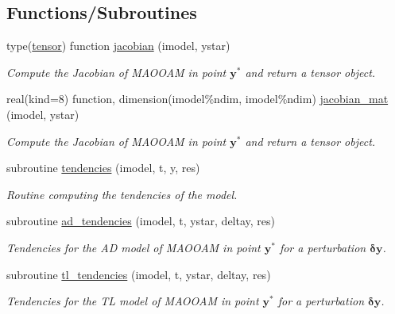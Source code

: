 \subsection*{Functions/\+Subroutines}
\begin{DoxyCompactItemize}
\item 
type(\hyperlink{structtensor__def_1_1tensor}{tensor}) function \hyperlink{namespacemodel__def_a85b43017a210edd78223c2557f67bbd5}{jacobian} (imodel, ystar)
\begin{DoxyCompactList}\small\item\em Compute the Jacobian of M\+A\+O\+O\+AM in point $\boldsymbol{y}^\ast$ and return a tensor object. \end{DoxyCompactList}\item 
real(kind=8) function, dimension(imodel\%ndim, imodel\%ndim) \hyperlink{namespacemodel__def_a755e953898ae980e1a45275b6eea8216}{jacobian\+\_\+mat} (imodel, ystar)
\begin{DoxyCompactList}\small\item\em Compute the Jacobian of M\+A\+O\+O\+AM in point $\boldsymbol{y}^\ast$ and return a tensor object. \end{DoxyCompactList}\item 
subroutine \hyperlink{namespacemodel__def_a9bca821e60fe70e58bf9eca53ebb0805}{tendencies} (imodel, t, y, res)
\begin{DoxyCompactList}\small\item\em Routine computing the tendencies of the model. \end{DoxyCompactList}\item 
subroutine \hyperlink{namespacemodel__def_a1622350bace311440f39acb8dc647059}{ad\+\_\+tendencies} (imodel, t, ystar, deltay, res)
\begin{DoxyCompactList}\small\item\em Tendencies for the AD model of M\+A\+O\+O\+AM in point $\boldsymbol{y}^\ast$ for a perturbation $\boldsymbol{\delta y}$. \end{DoxyCompactList}\item 
subroutine \hyperlink{namespacemodel__def_a77f89a429fafffdb6341feda8ff43274}{tl\+\_\+tendencies} (imodel, t, ystar, deltay, res)
\begin{DoxyCompactList}\small\item\em Tendencies for the TL model of M\+A\+O\+O\+AM in point $\boldsymbol{y}^\ast$ for a perturbation $\boldsymbol{\delta y}$. \end{DoxyCompactList}\item 

\end{DoxyCompactItemize}
